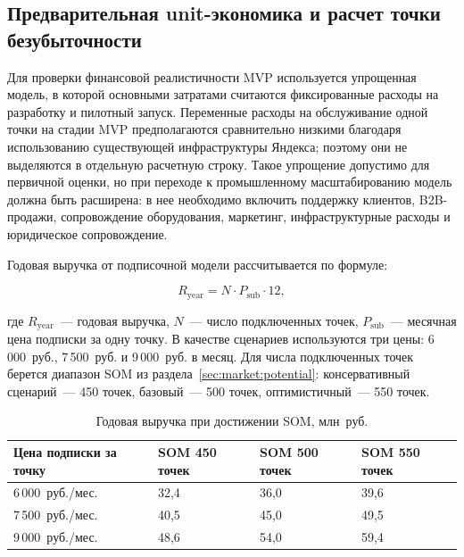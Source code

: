 \subsection{Предварительная unit-экономика и расчет точки безубыточности}
\label{subsec:service:monetization:unit}

Для проверки финансовой реалистичности MVP используется упрощенная модель, в которой основными затратами считаются фиксированные расходы на разработку и пилотный запуск. Переменные расходы на обслуживание одной точки на стадии MVP предполагаются сравнительно низкими благодаря использованию существующей инфраструктуры Яндекса; поэтому они не выделяются в отдельную расчетную строку. Такое упрощение допустимо для первичной оценки, но при переходе к промышленному масштабированию модель должна быть расширена: в нее необходимо включить поддержку клиентов, B2B-продажи, сопровождение оборудования, маркетинг, инфраструктурные расходы и юридическое сопровождение.

Годовая выручка от подписочной модели рассчитывается по формуле:

\begin{equation*}
    R_{\mathrm{year}} = N \cdot P_{\mathrm{sub}} \cdot 12,
\end{equation*}

где $R_{\mathrm{year}}$~--- годовая выручка, $N$~--- число подключенных точек, $P_{\mathrm{sub}}$~--- месячная цена подписки за одну точку. В качестве сценариев используются три цены: 6\,000~руб., 7\,500~руб. и 9\,000~руб. в месяц. Для числа подключенных точек берется диапазон SOM из раздела~\ref{sec:market:potential}: консервативный сценарий~--- 450 точек, базовый~--- 500 точек, оптимистичный~--- 550 точек.

\begin{table}[htbp]
\centering
\small
\caption{Годовая выручка при достижении SOM, млн~руб.}
\label{tab:service:som-revenue}
\begin{tabularx}{\textwidth}{p{}XXX}
\toprule
Цена подписки за точку & SOM 450 точек & SOM 500 точек & SOM 550 точек \\
\midrule
6\,000~руб./мес. & 32{,}4 & 36{,}0 & 39{,}6 \\
7\,500~руб./мес. & 40{,}5 & 45{,}0 & 49{,}5 \\
9\,000~руб./мес. & 48{,}6 & 54{,}0 & 59{,}4 \\
\bottomrule
\end{tabularx}
\end{table}

